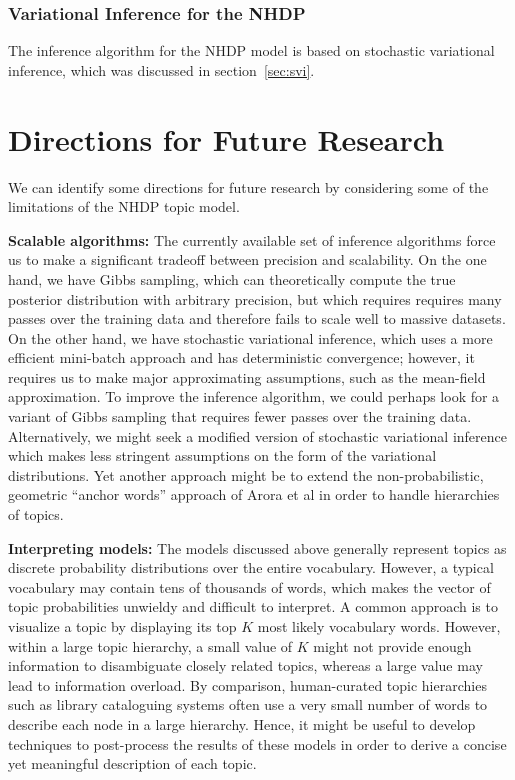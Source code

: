 \documentclass{article}
\begin{document}
\subsubsection{Variational Inference for the NHDP}

The inference algorithm for the NHDP model is based on stochastic variational inference, which was discussed in section~\ref{sec:svi}.

\section{Directions for Future Research}

We can identify some directions for future research by considering some of the limitations of the NHDP topic model.

\textbf{Scalable algorithms:}
The currently available set of inference algorithms force us to make a significant tradeoff between precision and scalability.
On the one hand, we have Gibbs sampling, which can theoretically compute the true posterior distribution with arbitrary precision, but which requires requires many passes over the training data and therefore fails to scale well to massive datasets.
On the other hand, we have stochastic variational inference, which uses a more efficient mini-batch approach and has deterministic convergence; however, it requires us to make major approximating assumptions, such as the mean-field approximation.
To improve the inference algorithm, we could perhaps look for a variant of Gibbs sampling that requires fewer passes over the training data.
Alternatively, we might seek a modified version of stochastic variational inference which makes less stringent assumptions on the form of the variational distributions.
Yet another approach might be to extend the non-probabilistic, geometric ``anchor words'' approach of Arora et al \cite{arora2013practical} in order to handle hierarchies of topics.

\textbf{Interpreting models:}
The models discussed above generally represent topics as discrete probability distributions over the entire vocabulary.
However, a typical vocabulary may contain tens of thousands of words, which makes the vector of topic probabilities unwieldy and difficult to interpret.
A common approach is to visualize a topic by displaying its top $K$ most likely vocabulary words.
However, within a large topic hierarchy, a small value of $K$ might not provide enough information to disambiguate closely related topics, whereas a large value may lead to information overload.
By comparison, human-curated topic hierarchies such as library cataloguing systems often use a very small number of words to describe each node in a large hierarchy.
Hence, it might be useful to develop techniques to post-process the results of these models in order to derive a concise yet meaningful description of each topic.
\end{document}
